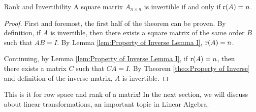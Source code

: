 \documentclass[../../../main.tex]{subfiles}
\begin{document}
\begin{theorem}{}{Rank and Invertibility}
A square matrix $A_{n \times n}$ is invertible if and only if
$\operatorname{r}(A) = n$.
\end{theorem}
\begin{proof}
First and foremost, the first half of the theorem can be proven.
By definition, if $A$ is invertible, then there exists a square matrix
of the same order $B$ such that $AB = I$. By Lemma \ref{lem:Property
of Inverse Lemma I}, $\operatorname{r}(A) = n$.

Continuing, by Lemma \ref{lem:Property of Inverse Lemma I}, if
$\operatorname{r}(A) = n$, then there exists a matrix $C$ such that $CA = I$.
By Theorem \ref{theo:Property of Inverse} and definition of the
inverse matrix, $A$ is invertible.
\end{proof}

This is it for row space and rank of a matrix! In the next section,
we will discuss about linear transformations, an important topic in
Linear Algebra.
\end{document}
